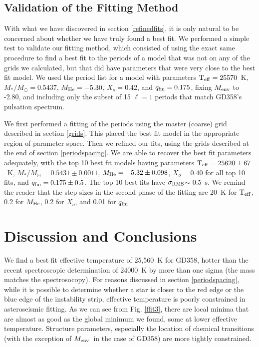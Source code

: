 \documentclass[12pt,preprint]{aastex}
\newcommand{\sigrms}{$\sigma_{\rm RMS}$}
\newcommand{\menv}{$M_{\rm env}$}
\begin{document}
\subsection{Validation of the Fitting Method}

With what we have discovered in section \ref{refinedfits}, it is only natural to be concerned about whether we have truly 
found a best fit. We performed a simple test to validate our fitting method, which consisted of using the exact same procedure 
to find a best fit to the periods of a model that was not on any of the grids we calculated, but that did have parameters that 
were very close to the best fit model. We used the period list for a model with parameters 
${\rm T_{eff}}=25570$~K, $M_*/M_\odot=0.5437$, $M_{\rm He}=-5.30$, $X_o=0.42$, and $q_{\rm fm}=0.175$, 
fixing $M_{\rm env}$ to -2.80, and including only the subset of 15 $\ell=1$ periods that match GD358's pulsation spectrum.

We first performed a fitting of the periods using the master (coarse) grid described in section \ref{grids}. This 
placed the best fit model in the appropriate region of parameter space. Then we refined our fits, using the grids 
described at the end of section \ref{periodspacing}. We are able to recover the best fit parameters adequately, with 
the top 10 best fit models having parameters 
${\rm T_{eff}}=25620 \pm 67$~K, $M_*/M_\odot=0.5431 \pm 0.0011$, $M_{\rm He}=-5.32 \pm 0.098$, $X_o=0.40$ for all top 
10 fits, and $q_{\rm fm}=0.175 \pm 0.5$. The top 10 best fits have \sigrms $\sim$ 0.5~s. We remind the reader that 
the step sizes in the second phase of the fitting are 20~K for ${\rm T_{eff}}$, 0.2 for $M_{\rm He}$, 0.2 for $X_o$, 
and 0.01 for $q_{\rm fm}$.

\section{Discussion and Conclusions}
\label{discussion}

We find a best fit effective temperature of 25,560~K for GD358, hotter than the recent spectroscopic determination of 
24000~K \citep{Koester2013} by more than one sigma (the mass matches the spectrosocopy). For reasons discussed in 
section \ref{periodspacing}, while it is possible to determine whether a star is closer to the red edge or the 
blue edge of the instability strip, effective temperature is poorly constrained in asteroseismic fitting. As we can 
see from Fig. \ref{ffit3}, there are local minima that are almost as good as the global minimum we found, some at 
lower effective temperature. Structure parameters, especially the location of chemical transitions 
(with the exception of \menv\ in the case of GD358) are more tightly constrained.
\end{document}
